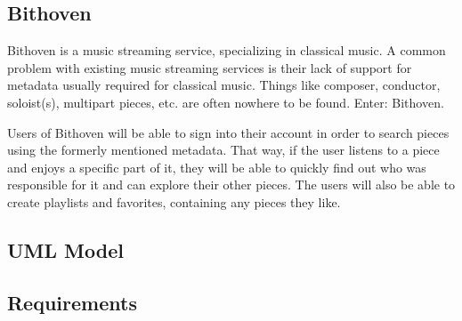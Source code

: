 
\subsection{Bithoven}
\label{project-description-bithoven}
Bithoven is a music streaming service, specializing in classical music. A common
problem with existing music streaming services is their lack of support for
metadata usually required for classical music. Things like composer, conductor,
soloist(s), multipart pieces, etc. are often nowhere to be found. Enter:
Bithoven.

Users of Bithoven will be able to sign into their account in order to search
pieces using the formerly mentioned metadata. That way, if the user listens to
a piece and enjoys a specific part of it, they will be able to quickly find out
who was responsible for it and can explore their other pieces. The users will
also be able to create playlists and favorites, containing any pieces they like.

\subsection{UML Model}
\label{project-description-uml}

\subsection{Requirements}
\label{project-description-req}

